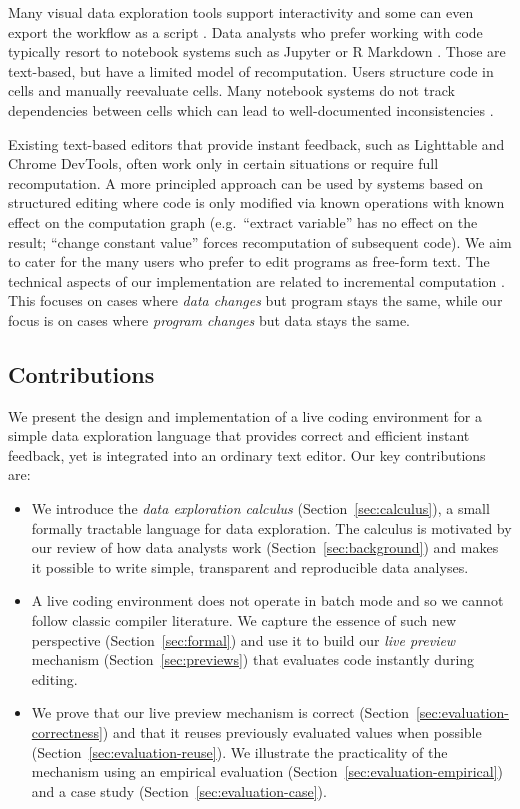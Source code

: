 \documentclass[english,submission]{programming}
\theoremstyle{plain}
\theoremstyle{definition}
\begin{document}
Many visual data exploration tools support interactivity \cite{control,tableau,vizdom} and some
can even export the workflow as a script \cite{wrangler}. Data analysts who prefer working with
code typically resort to notebook systems such as Jupyter or R Markdown \cite{jupyter,rmarkdown}.
Those are text-based, but have a limited model of recomputation. Users structure code in
cells and manually reevaluate cells. Many notebook systems do not track dependencies
between cells which can lead to well-documented inconsistencies \cite{dataflow,noworkflow,wrattler}.

Existing text-based editors that provide instant feedback,
such as Lighttable \cite{lighttable} and Chrome DevTools, often work only in certain
situations or require full recomputation. A more principled approach can be used by
systems based on structured editing \cite{livenut,lamdu} where code is only
modified via known operations with known effect on the computation graph
(e.g.~``extract variable'' has no effect on the result; ``change constant value''
forces recomputation of subsequent code). We aim to cater for the many users who
prefer to edit programs as free-form text.
%
The technical aspects of our implementation are related to incremental computation \cite{selfadjusting,incremental}.
This focuses on cases where \emph{data changes} but program stays the same, while our focus is on cases where
\emph{program changes} but data stays the same.

\subsection{Contributions}
We present the design and implementation of a live coding environment for a simple data exploration
language that provides correct and efficient instant feedback, yet is integrated into an
ordinary text editor. Our key contributions are:

\begin{itemize}
\item We introduce the \emph{data exploration calculus} (Section~\ref{sec:calculus}), a small formally
  tractable language for data exploration. The calculus is motivated by our review
  of how data analysts work (Section~\ref{sec:background}) and makes it possible to write simple,
  transparent and reproducible data analyses.

\item A live coding environment does not operate in batch mode and so we cannot follow classic
  compiler literature. We capture the essence of such new perspective (Section~\ref{sec:formal})
  and use it to build our \emph{live preview} mechanism (Section~\ref{sec:previews}) that evaluates
  code instantly during editing.

\item We prove that our live preview mechanism is correct (Section~\ref{sec:evaluation-correctness}) and that
  it reuses previously evaluated values when possible (Section~\ref{sec:evaluation-reuse}). We
  illustrate the practicality of the mechanism using an empirical evaluation
  (Section~\ref{sec:evaluation-empirical}) and a case study (Section~\ref{sec:evaluation-case}).
\end{itemize}
\end{document}
